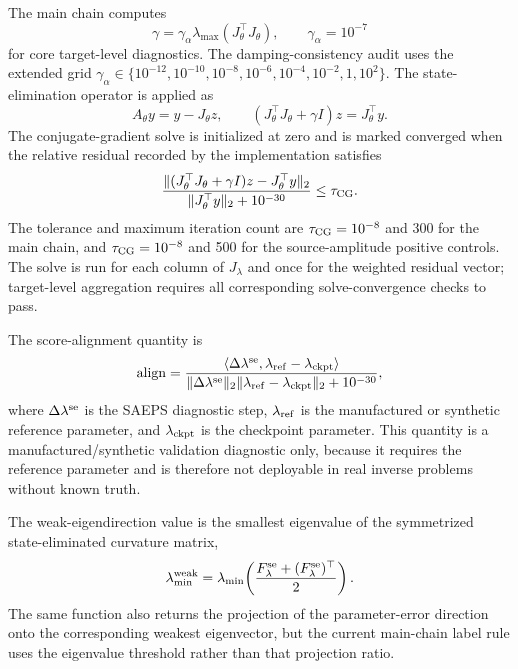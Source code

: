 \documentclass[preprint,12pt]{elsarticle}
\begin{document}
The main chain computes
\begin{equation}
    \gamma=\gamma_\alpha \lambda_{\max}(J_\theta^\top J_\theta),
    \qquad \gamma_\alpha=10^{-7}
\end{equation}
for core target-level diagnostics. The damping-consistency audit uses the extended grid $\gamma_\alpha\in\{10^{-12},10^{-10},10^{-8},10^{-6},10^{-4},10^{-2},1,10^{2}\}$.  The state-elimination operator is applied as
\begin{equation}
    A_\theta y
    =
    y-J_\theta z,\qquad
    (J_\theta^\top J_\theta+\gamma I)z=J_\theta^\top y.
\end{equation}
The conjugate-gradient solve is initialized at zero and is marked converged when the relative residual recorded by the implementation satisfies
\begin{equation}
    \frac{\|(J_\theta^\top J_\theta+\gamma I)z-J_\theta^\top y\|_2}
    {\|J_\theta^\top y\|_2+10^{-30}}
    \le \tau_{\rm CG}.
\end{equation}
The tolerance and maximum iteration count are $\tau_{\rm CG}=10^{-8}$ and 300 for the main chain, and $\tau_{\rm CG}=10^{-8}$ and 500 for the source-amplitude positive controls.  The solve is run for each column of $J_\lambda$ and once for the weighted residual vector; target-level aggregation requires all corresponding solve-convergence checks to pass.

The score-alignment quantity is
\begin{equation}
    \mathrm{align}
    =
    \frac{
    \langle \Delta\lambda^{\rm se},\lambda_{\rm ref}-\lambda_{\rm ckpt}\rangle
    }{
    \|\Delta\lambda^{\rm se}\|_2\|\lambda_{\rm ref}-\lambda_{\rm ckpt}\|_2+10^{-30}
    },
\end{equation}
where $\Delta\lambda^{\rm se}$ is the SAEPS diagnostic step, $\lambda_{\rm ref}$ is the manufactured or synthetic reference parameter, and $\lambda_{\rm ckpt}$ is the checkpoint parameter.  This quantity is a manufactured/synthetic validation diagnostic only, because it requires the reference parameter and is therefore not deployable in real inverse problems without known truth.

The weak-eigendirection value is the smallest eigenvalue of the symmetrized state-eliminated curvature matrix,
\begin{equation}
    \lambda_{\min}^{\rm weak}
    =
    \lambda_{\min}\!\left(\frac{F_\lambda^{\rm se}+(F_\lambda^{\rm se})^\top}{2}\right).
\end{equation}
The same function also returns the projection of the parameter-error direction onto the corresponding weakest eigenvector, but the current main-chain label rule uses the eigenvalue threshold rather than that projection ratio.
\end{document}
